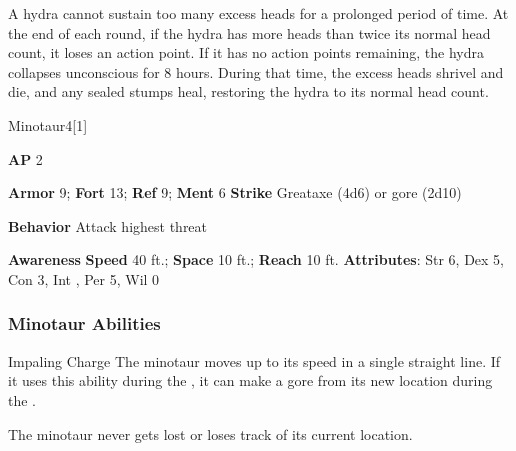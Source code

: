A hydra cannot sustain too many excess heads for a prolonged period of time.
At the end of each round, if the hydra has more heads than twice its normal head count, it loses an action point.
If it has no action points remaining, the hydra collapses unconscious for 8 hours.
During that time, the excess heads shrivel and die, and any sealed stumps heal, restoring the hydra to its normal head count.

\begin{monsection}{Minotaur}{4}[1]
\vspace{-1em}\vspace{-1em}
\begin{spellcontent}
\begin{spelltargetinginfo}
{\textbf{AP} 2}

\pari \textbf{Armor} 9;
\textbf{Fort} 13;
\textbf{Ref} 9;
\textbf{Ment} 6
\pari \textbf{Strike} Greataxe  (4d6) or gore  (2d10)



\pari \textbf{Behavior} Attack highest threat
\end{spelltargetinginfo}
\end{spellcontent}

\begin{monsterfooter}
\pari \textbf{Awareness} 
\pari \textbf{Speed} 40 ft.;
\textbf{Space} 10 ft.;
\textbf{Reach} 10 ft.
\pari \textbf{Attributes}:
Str 6,
Dex 5,
Con 3,
Int ,
Per 5,
Wil 0
\end{monsterfooter}
\end{monsection}


\subsubsection{Minotaur Abilities}

\begin{ability}{Impaling Charge}
The minotaur moves up to its speed in a single straight line.
If it uses this ability during the , it can make a gore  from its new location during the .
\end{ability}

The minotaur never gets lost or loses track of its current location.

